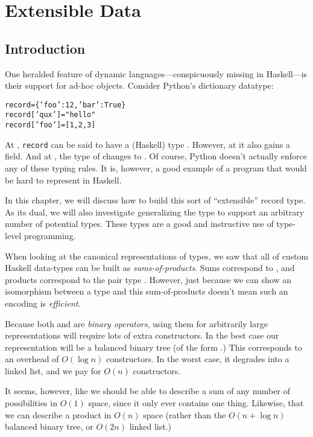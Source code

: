 \documentclass[book.tex]{subfiles}
\begin{document}
\chapter{Extensible Data}

\section{Introduction}

One heralded feature of dynamic languages---conspicuously missing in
Haskell---is their support for ad-hoc objects. Consider Python's dictionary
datatype:

\begin{alltt}
record = \{ 'foo': 12, 'bar': True \} 
record['qux'] = "hello" 
record['foo'] = [1, 2, 3] 
\end{alltt}

At , \texttt{record} can be said to have a (Haskell) type
. However, at  it also gains a
 field. And at , the type of  changes to
\hs{[Int]}. Of course, Python doesn't actually enforce any of these typing
rules. It is, however, a good example of a program that would be hard to
represent in Haskell.

In this chapter, we will discuss how to build this sort of ``extensible'' record
type. As its dual, we will also investigate generalizing the  type to
support an arbitrary number of potential types. These types are a good and
instructive use of type-level programming.

When looking at the canonical representations of types, we saw that all of
custom Haskell data-types can be built as \emph{sums-of-products}. Sums
correspond to , and products correspond to the pair type . However, just because we can show an \gls{isomorphism} between a type and this
sum-of-products doesn't mean such an encoding is \emph{efficient}.

Because both  and \ty{(,)} are \emph{binary operators},
using them for arbitrarily large representations will require lots of extra
constructors. In the best case our representation will be a balanced binary tree
(of the form .) This corresponds to an
overhead of $O(\log{n})$ constructors. In the worst case, it degrades into a
linked list, and we pay for $O(n)$ constructors.

It seems, however, like we should be able to describe a sum of any number of
possibilities in $O(1)$ space, since it only ever contains one thing. Likewise,
that we can describe a product in $O(n)$ space (rather than the $O(n+\log{n})$
balanced binary tree, or $O(2n)$ linked list.)
\end{document}
